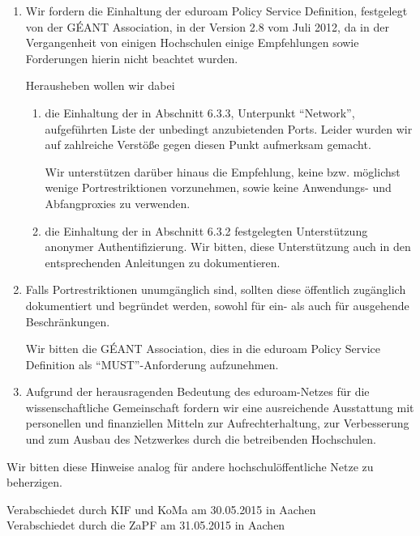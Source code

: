 \documentclass[DIV=calc]{scrartcl}
\begin{document}
  \begin{enumerate}
  \item Wir fordern die Einhaltung der eduroam Policy Service Definition,
    festgelegt von der GÉANT Association, in der Version 2.8 vom Juli 2012, da
    in der Vergangenheit von einigen Hochschulen einige Empfehlungen sowie
    Forderungen hierin nicht beachtet wurden.

    Herausheben wollen wir dabei
    \begin{enumerate}
    \item  die Einhaltung der in Abschnitt 6.3.3, Unterpunkt ``Network'',
      aufgeführten Liste der unbedingt anzubietenden Ports. Leider wurden wir
      auf zahlreiche Verstöße gegen diesen Punkt aufmerksam gemacht.

      Wir unterstützen darüber hinaus die Empfehlung, keine
      bzw. möglichst wenige Portrestriktionen vorzunehmen, sowie keine
      Anwendungs- und Abfangproxies zu verwenden.

    \item die Einhaltung der in Abschnitt 6.3.2 festgelegten Unterstützung
      anonymer Authentifizierung. Wir bitten, diese Unterstützung auch in den
      entsprechenden Anleitungen zu dokumentieren.
    \end{enumerate}
  \item Falls Portrestriktionen unumgänglich sind, sollten diese öffentlich
    zugänglich dokumentiert und begründet werden, sowohl für ein- als auch für
    ausgehende Beschränkungen.

    Wir bitten die GÉANT Association, dies in die eduroam Policy Service Definition
    als ``MUST''-Anforderung aufzunehmen.

  \item Aufgrund der herausragenden Bedeutung des eduroam-Netzes für die
    wissenschaftliche Gemeinschaft fordern wir eine ausreichende Ausstattung mit
    personellen und finanziellen Mitteln zur Aufrechterhaltung, zur Verbesserung
    und zum Ausbau des Netzwerkes durch die betreibenden Hochschulen.
  \end{enumerate}

  Wir bitten diese Hinweise analog für andere hochschulöffentliche Netze zu
  beherzigen.

\vfill
\begin{flushright}
Verabschiedet durch KIF und KoMa am 30.05.2015 in Aachen \\
Verabschiedet durch die ZaPF am 31.05.2015 in Aachen
\end{flushright}
\end{document}
